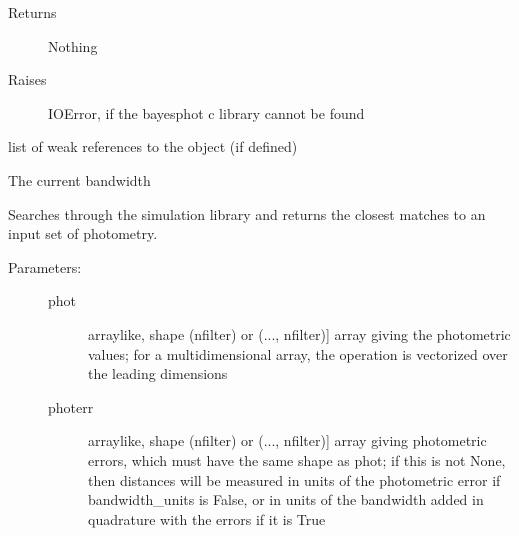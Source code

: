\documentclass[letterpaper,10pt,english]{sphinxmanual}
\begin{document}
\begin{fulllineitems}
\begin{fulllineitems}
\begin{description}
\begin{description}
\end{description}

\item[{Returns}] \leavevmode
Nothing

\item[{Raises}] \leavevmode
IOError, if the bayesphot c library cannot be found

\end{description}

\end{fulllineitems}


\begin{fulllineitems}
\label{bayesphot:slugpy.bayesphot.bp.bp.__weakref__}
list of weak references to the object (if defined)

\end{fulllineitems}


\begin{fulllineitems}
\label{bayesphot:slugpy.bayesphot.bp.bp.bandwidth}
The current bandwidth

\end{fulllineitems}


\begin{fulllineitems}
\label{bayesphot:slugpy.bayesphot.bp.bp.bestmatch}
Searches through the simulation library and returns the closest
matches to an input set of photometry.
\begin{description}
\item[{Parameters:}] \leavevmode\begin{description}
\item[{phot}] \leavevmode{[}arraylike, shape (nfilter) or (..., nfilter){]}
array giving the photometric values; for a
multidimensional array, the operation is vectorized over
the leading dimensions

\item[{photerr}] \leavevmode{[}arraylike, shape (nfilter) or (..., nfilter){]}
array giving photometric errors, which must have the
same shape as phot; if this is not None,
then distances will be measured in units of the
photometric error if bandwidth\_units is False, or in
units of the bandwidth added in quadrature with the
errors if it is True


\end{description}
\end{description}
\end{fulllineitems}
\end{fulllineitems}
\end{document}
